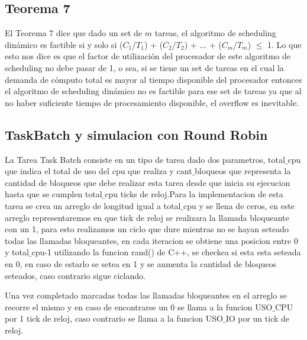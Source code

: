 \subsection{Teorema 7}
El Teorema 7 dice que dado un set de $m$ tareas, el algoritmo de scheduling dinámico es factible si y solo si ($C_1$/$T_1$) + ($C_2$/$T_2$) + ... + ($C_m$/$T_m$) $\le$ 1. Lo que esto nos dice es que el factor de utilización del procesador de este algoritmo de scheduling no debe pasar de 1, o sea, si se tiene un set de tareas en el cual la demanda de cómputo total es mayor al tiempo disponible del procesador entonces el algoritmo de scheduling dinámico no es factible para ese set de tareas ya que al no haber suficiente tiempo de procesamiento disponible, el overflow es inevitable.


\subsection{TaskBatch y simulacion con Round Robin}
La Tarea Task Batch consiste en un tipo de tarea dado dos parametros, total$\_$cpu que indica el total de uso del cpu que realiza y cant$\_$bloqueos que representa la cantidad de bloqueos que debe realizar esta tarea desde que inicia su ejecucion hasta que se cumplen total$\_$cpu ticks de reloj.Para la implementacion de esta tarea se crea un arreglo de longitud igual a total$\_$cpu y se llena de ceros, en este arreglo representaremos en que tick de reloj se realizara la llamada bloqueante con un 1, para esto realizamos un ciclo que dure mientras no se hayan seteado todas las llamadas bloqueantes, en cada iteracion se obtiene una posicion entre 0 y total$\_$cpu-1 utilizando la funcion rand() de C++, se checkea si esta esta seteada en 0, en caso de estarlo se setea en 1 y se aumenta la cantidad de bloqueos seteados, caso contrario sigue ciclando.

Una vez completado marcadas todas las llamadas bloqueantes en el arreglo se recorre el mismo y en caso de encontrarse un 0 se llama a la funcion USO$\_$CPU por 1 tick de reloj, caso contrario se llama a la funcion USO$\_$IO por un tick de reloj.


